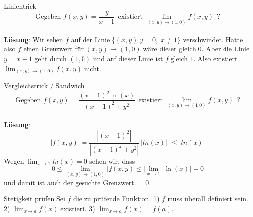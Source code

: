 \begin{Beispiel}{Linientrick}{}
\[ \text{Gegeben } f(x,y) = \frac{y}{x-1} ~~ \text{existiert} ~~ \lim_{(x,y)\rightarrow(1,0)} f(x,y) ~~ \text{?}\]
\\
\textbf{Lösung}: Wir sehen $f$ auf der Linie $\{ (x,y) | y=0, \; x \neq 1 \}$ verschwindet. Hätte also
$f$ einen Grenzwert für $(x,y) \rightarrow (1,0)$ wäre dieser gleich $0$. Aber die Linie $y=x-1$ geht
durch $(1, 0)$ und auf dieser Linie ist $f$ gleich $1$. Also existiert $\lim_{(x,y) \rightarrow (1, 0)} f(x,y)$ nicht.
\end{Beispiel}

\begin{Beispiel}{Vergleichstrick / Sandwich}{}
\[ \text{Gegeben } f(x,y) = \frac{(x-1)^2 \ln(x)}{(x-1)^2 + y^2} ~~ \text{existiert} ~~ \lim_{(x,y)\rightarrow(1,0)} f(x,y) ~~ \text{?}\]
\\
\textbf{Lösung}: 
\[ |f(x,y)| = \frac{|(x-1)^2|}{|(x-1)^2 + y^2|} \; |ln(x)| ~~ \leq |ln(x)| \]
Wegen $\lim_{x\rightarrow 1} ln(x) = 0$ sehen wir, dass 
\[ 0 \leq \lim_{(x,y) \rightarrow (1,0)} |f(x,y) \leq |\lim_{x\rightarrow 1} |\ln(x)| = 0\]
und damit ist auch der gesuchte Grenzwert $ = 0$.
\end{Beispiel}



\begin{Rezept}{Stetigkeit prüfen}{}
    Sei $f$ die zu prüfende Funktion. 1) $f$ muss überall definiert sein. 2) $\lim_{x \rightarrow a} f(x)$ existiert. 3) $\lim_{x \rightarrow a} f(x) = f(a)$.
\end{Rezept}
